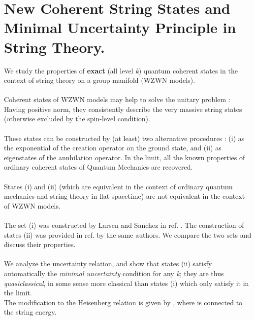 \documentclass[12pt,a4paper]{article}
\begin{document}
\section{New Coherent String States and Minimal Uncertainty Principle in 
String Theory.}
We study the properties of {\bf exact} (all level {\it k}) quantum coherent 
states in the context of string theory on a group manifold (WZWN models). \\ \\
Coherent states of WZWN models may help to solve the unitary problem : Having 
positive norm, they consistently describe the very massive string states 
(otherwise excluded by the spin-level condition).\\ \\
These states can be constructed by (at least) two alternative procedures : 
(i) as the exponential of the creation operator on the ground state, and (ii) 
as eigenstates of the annhilation operator. In the \coordHE{} 
limit, all the known properties of ordinary coherent states of Quantum 
Mechanics are recovered. \\ \\
States (i) and (ii) (which are equivalent in the context of ordinary quantum 
mechanics and string theory in flat spacetime) are not equivalent in the 
context of WZWN models.\\ \\ The set (i) was constructed by Larsen and Sanchez 
in ref. \cite{ls}. The construction of states (ii) was provided in ref.  
\cite{ls2} by the same authors. We compare the two sets and discuss their 
properties. \\ \\
We analyze the uncertainty relation, and show that states (ii) satisfy 
automatically the {\it minimal uncertainty} condition for any {\it k}; 
they 
are thus {\it quasiclassical}, in some sense more classical than states 
(i) 
which 
only satisfy it in the \coordHE{} limit.\\ The modification to the Heisenberg relation is given by \coordHE{}, where \coordHE{} is 
connected to the string energy.\\ 
\end{document}
